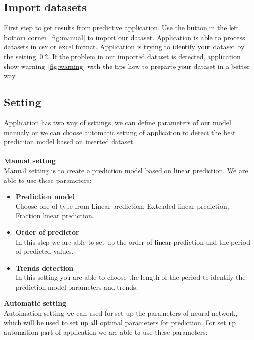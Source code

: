         \subsection{Import datasets}
        First step to get results from predictive application. Use the button in the left
        bottom corner~\ref{fig:manual} to import our dataset. Application is able to
        process datasets in csv or excel format. Application is trying to identify
        your dataset by the setting~\ref{subsec:setting}. If the problem in our imported
        dataset is detected, application show warning~\ref{fig:warning} with the tips
        how to preparte your dataset in a better way.
        \subsection{Setting}\label{subsec:setting}
        Application has two way of settings, we can define parameters of our model manualy or
        we can choose automatic setting of application to detect the best prediction model
        based on inserted dataset.\\
        \\
        \textbf{Manual setting}\\
        Manual setting is to create a prediction model based on linear prediction. We are
        able to use these parameters:
        \begin{itemize}
            \item \textbf{Prediction model}\\
            Choose one of type from Linear prediction, Extended linear prediction,
            Fraction linear prediction.
            \item \textbf{Order of predictor}\\
            In this step we are able to set up the order of linear prediction and the
            period of predicted values.
            \item \textbf{Trends detection}\\
            In this setting you are able to choose the length of the period to 
            identify the prediction model parameters and trends.
        \end{itemize}
        \noindent
        \textbf{Automatic setting}\\
        Autoimation setting we can used for set up the parameters of neural network,
        which will be used to set up all optimal parameters for prediction. For set up
        automation part of application we are able to use these parameters:\\
